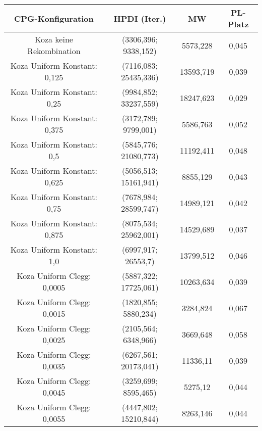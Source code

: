  \begin{table}[H]
	\centering
	\begin{tabular}{c | c | c | c}
		\textbf{CPG-Konfiguration} & \textbf{HPDI (Iter.)} & \textbf{MW} & \textbf{PL-Platz}\\
		\hline
		Koza keine Rekombination & (3306,396; 9338,152) & 5573,228 & 0,045\\
		\hline
		\hline
		Koza Uniform Konstant: 0,125 & (7116,083; 25435,336) & 13593,719 & 0,039\\
		\hline
		Koza Uniform Konstant: 0,25 & (\color{red}9984,852\color{black}; \color{red}33237,559\color{black}) & \color{red}18247,623\color{black} & \color{red}0,029\color{black}\\
		\hline
		Koza Uniform Konstant: 0,375 & (\color{Green}3172,789\color{black}; 9799,001) & 5586,763 & \color{Green}0,052\color{black}\\
		\hline
		Koza Uniform Konstant: 0,5 & (5845,776; 21080,773) & 11192,411 & 0,048\\
		\hline
		Koza Uniform Konstant: 0,625 & (5056,513; 15161,941) & 8855,129 & 0,043\\
		\hline
		Koza Uniform Konstant: 0,75 & (7678,984; \color{red}28599,747\color{black}) & \color{red}14989,121\color{black} & 0,042\\
		\hline
		Koza Uniform Konstant: 0,875 & (\color{red}8075,534\color{black}; 25962,001) & 14529,689 & 0,037\\
		\hline
		Koza Uniform Konstant: 1,0 & (6997,917; 26553,7) & 13799,512 & 0,046\\
		\hline
		\hline
		Koza Uniform Clegg: 0,0005 & (5887,322; 17725,061) & 10263,634 & 0,039\\
		\hline
		Koza Uniform Clegg: 0,0015 & (\color{Green}1820,855\color{black}; \color{Green}5880,234\color{black}) & \color{Green}3284,824\color{black} & \color{Green}0,067\color{black}\\
		\hline
		Koza Uniform Clegg: 0,0025 & (\color{Green}2105,564\color{black}; \color{Green}6348,966\color{black}) & \color{Green}3669,648\color{black} & \color{Green}0,058\color{black}\\
		\hline
		Koza Uniform Clegg: 0,0035 & (6267,561; 20173,041) & 11336,11 & 0,039\\
		\hline
		Koza Uniform Clegg: 0,0045 & (3259,699; \color{Green}8595,465\color{black}) & \color{Green}5275,12\color{black} & 0,044\\
		\hline
		Koza Uniform Clegg: 0,0055 & (4447,802; 15210,844) & 8263,146 & 0,044\\

\end{tabular}
\end{table}
